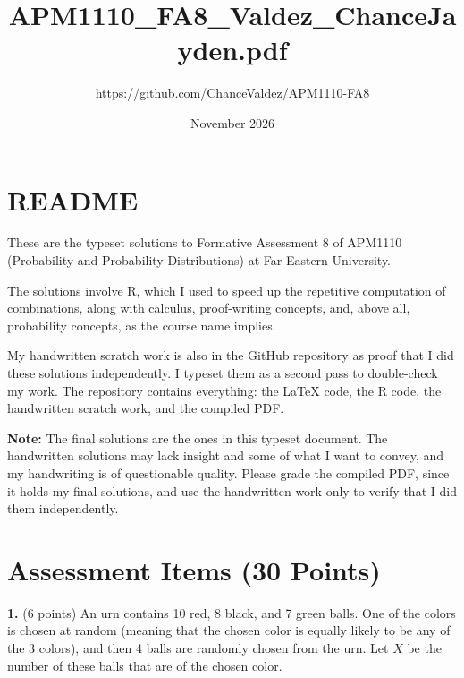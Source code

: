 \documentclass[letterpaper]{article}
\title{APM1110\_FA8\_Valdez\_ChanceJayden.pdf}
\author{\url{https://github.com/ChanceValdez/APM1110-FA8}}
\date{November 2026}
\begin{document}
\maketitle
\section*{README}

These are the typeset solutions to Formative Assessment 8 of APM1110 (Probability and Probability Distributions) at Far Eastern University. 

The solutions involve R, which I used to speed up the repetitive computation of combinations, along with calculus, proof-writing concepts, and, above all, probability concepts, as the course name implies.

My handwritten scratch work is also in the GitHub repository as proof that I did these solutions independently. I typeset them as a second pass to double-check my work. The repository contains everything: the \LaTeX{} code, the R code, the handwritten scratch work, and the compiled PDF.

\textbf{Note:} The final solutions are the ones in this typeset document. The handwritten solutions may lack insight and some of what I want to convey, and my handwriting is of questionable quality. Please grade the compiled PDF, since it holds my final solutions, and use the handwritten work only to verify that I did them independently.

\section*{Assessment Items (30 Points)}

\textbf{1.} (6 points) An urn contains 10 red, 8 black, and 7 green balls. One of the colors is chosen at random (meaning that the chosen color is equally likely to be any of the 3 colors), and then 4 balls are randomly chosen from the urn. Let $X$ be the number of these balls that are of the chosen color.
\end{document}
